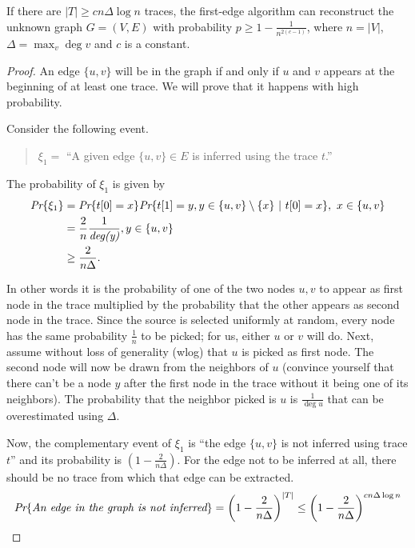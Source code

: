  \begin{thm}
 	 If there are $|T| \geq cn\Delta\log n$ traces, the first-edge algorithm can reconstruct the unknown graph $G=(V, E)$ with probability $p \geq 1 - \frac{1}{n^{2(c-1)}}$, where $n = |V|$, $\Delta = \max_v \deg{v}$ and $c$ is a constant.
 \end{thm}
\begin{proof}
	An edge $\{u, v\}$ will be in the graph if and only if $u$ and $v$ appears at the beginning of at least one trace. We will prove that it happens with high probability.
	
	Consider the following event.
	\begin{quotation}
		$\xi_1 =$ ``A given edge $\{u, v\} \in E$ is inferred using the trace $t$.''
	\end{quotation}
	
	The probability of $\xi_1$ is given by
	\begin{align}
	\emph{Pr}\{\xi_1\} &= \emph{Pr}\{t[0] = x\}\emph{Pr}\{t[1] = y, y\in \{u, v\}\setminus\{x\}\ |\ t[0] = x\},\  x\in \{u, v\}\\
	&= \frac{2}{n}\frac{1}{\deg{y}}, y \in \{u, v\}\\
	&\geq \frac{2}{n\Delta}.
	\end{align}
	
	In other words it is the probability of one of the two nodes $u, v$ to appear as first node in the trace multiplied by the probability that the other appears as second node in the trace. Since the source is selected uniformly at random, every node has the same probability $\frac{1}{n}$ to be picked; for us, either $u$ or $v$ will do. Next, assume without loss of generality (wlog) that $u$ is picked as first node. The second node will now be drawn from the neighbors of $u$ (convince yourself that there can't be a node $y$ after the first node in the trace without it being one of its neighbors). The probability that the neighbor picked is $u$ is $\frac{1}{\deg{u}}$ that can be overestimated using $\Delta$.
	
	Now, the complementary event of $\xi_1$ is ``the edge $\{u,v\}$ is not inferred using trace $t$'' and its probability is $(1 - \frac{2}{n\Delta})$. For the edge not to be inferred at all, there should be no trace from which that edge can be extracted.
	\begin{equation}
	\pr{\emph{An edge in the graph is not inferred}} = \left(1- \frac{2}{n\Delta}\right)^{|T|} \leq \left(1- \frac{2}{n\Delta}\right)^{cn\Delta\log n} 
	\end{equation}
	

\end{proof}
